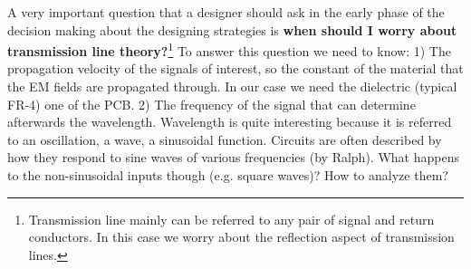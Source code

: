 \documentclass[final]{cubedoc}
\begin{document}
	A very important question that a designer should ask in the early phase of the decision making about the designing strategies is \textbf{when should I worry about transmission line theory?}\footnote{Transmission line mainly can be referred to any pair of signal and return conductors. In this case we worry about the reflection aspect of transmission lines.} To answer this question we need to know: 1) The propagation velocity of the signals of interest, so the constant of the material that the EM fields are propagated through. In our case we need the dielectric (typical FR-4) one of the PCB. 2) The frequency of the signal that can determine afterwards the wavelength. Wavelength is quite interesting because it is referred to an oscillation, a wave, a sinusoidal function. Circuits are often described by how they respond to sine waves of various frequencies (by Ralph). What happens to the non-sinusoidal inputs though (e.g. square waves)? How to analyze them? 
	
	
	
	
	
\end{document}
